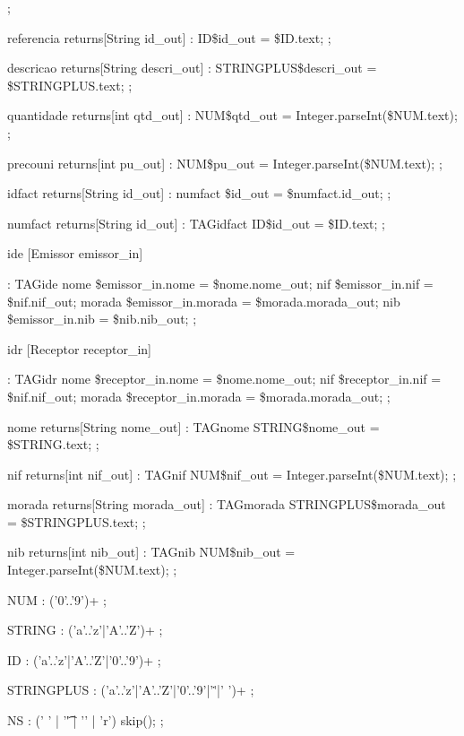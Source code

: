 \documentclass[11pt,a4paper]{article}
\begin{document}
\begin{code_txt}
	;	
	
referencia
returns[String id_out]
	:	ID{\$id_out = \$ID.text;}
	;	
	
descricao
returns[String descri_out]
	:	STRINGPLUS{\$descri_out = \$STRINGPLUS.text;}
	;	
	
quantidade	
returns[int qtd_out]
	:	NUM{\$qtd_out = Integer.parseInt(\$NUM.text);}
	;	
	
precouni
returns[int pu_out]	
	:	NUM{\$pu_out = Integer.parseInt(\$NUM.text);}
	;	
	
	
idfact 
returns[String id_out]
	:	numfact {\$id_out = \$numfact.id_out;}
	;
	
numfact
returns[String id_out]
	:	TAGidfact	ID{\$id_out = \$ID.text;}
	;
	
ide [Emissor emissor_in]

	:	TAGide	
		nome	{\$emissor_in.nome = \$nome.nome_out;}
		nif	{\$emissor_in.nif = \$nif.nif_out;}
		morada	{\$emissor_in.morada = \$morada.morada_out;}
		nib	{\$emissor_in.nib = \$nib.nib_out;}
	;
	
idr [Receptor receptor_in]	

	:	TAGidr	
		nome	{\$receptor_in.nome = \$nome.nome_out;}
		nif	{\$receptor_in.nif = \$nif.nif_out;}
		morada	{\$receptor_in.morada = \$morada.morada_out;}
	;

nome
returns[String nome_out]
	:	TAGnome	STRING{\$nome_out = \$STRING.text;}
	;
	
nif
returns[int nif_out]
	:	TAGnif	NUM{\$nif_out = Integer.parseInt(\$NUM.text);}
	;

morada
returns[String morada_out]
	:	TAGmorada	STRINGPLUS{\$morada_out = \$STRINGPLUS.text;}
	;

nib
returns[int nib_out]
	:	TAGnib	NUM{\$nib_out = Integer.parseInt(\$NUM.text);}
	;

NUM 	:	('0'..'9')+
	;

STRING	:	('a'..'z'|'A'..'Z')+
	;

ID	:	('a'..'z'|'A'..'Z'|'0'..'9')+
	;
	
STRINGPLUS	:	('a'..'z'|'A'..'Z'|'0'..'9'|'\.'|' ')+
	;

NS	:  	(' ' | '\t' | '\n' | 'r') { skip(); }
   	;
\end{code_txt}
\end{document}
